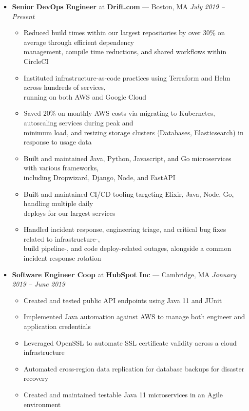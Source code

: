 \documentclass{article}
\begin{document}
\begin{itemize}[label={},leftmargin=*]
  \item \textbf{Senior DevOps Engineer} at \textbf{Drift.com} --- Boston, MA \hfill {\em July 2019 -- Present}
  \begin{itemize}[label={$\bullet$}]
    \item Reduced build times within our largest repositories by over 30\% on average through efficient dependency\\
          management, compile time reductions, and shared workflows within CircleCI
    \item Instituted infrastructure-as-code practices using Terraform and Helm across hundreds of services,\\
          running on both AWS and Google Cloud
    \item Saved 20\% on monthly AWS costs via migrating to Kubernetes, autoscaling services during peak and\\
          minimum load, and resizing storage clusters (Databases, Elasticsearch) in response to usage data
    \item Built and maintained Java, Python, Javascript, and Go microservices with various frameworks,\\ 
          including Dropwizard, Django, Node, and FastAPI
    \item Built and maintained CI/CD tooling targeting Elixir, Java, Node, Go, handling multiple daily\\
          deploys for our largest services
    \item Handled incident response, engineering triage, and critical bug fixes related to infrastructure-,\\ 
          build pipeline-, and code deploy-related outages, alongside a common incident response rotation
  \end{itemize}

  \item \textbf{Software Engineer Coop} at \textbf{HubSpot Inc} --- Cambridge, MA \hfill {\em January 2019 -- June 2019}
  \begin{itemize}[label={$\bullet$}]
    \item Created and tested public API endpoints using Java 11 and JUnit
    \item Implemented Java automation against AWS to manage both engineer and application credentials
    \item Leveraged OpenSSL to automate SSL certificate validity across a cloud infrastructure
    \item Automated cross-region data replication for database backups for disaster recovery
    \item Created and maintained testable Java 11 microservices in an Agile environment
  \end{itemize}


\end{itemize}
\end{document}
